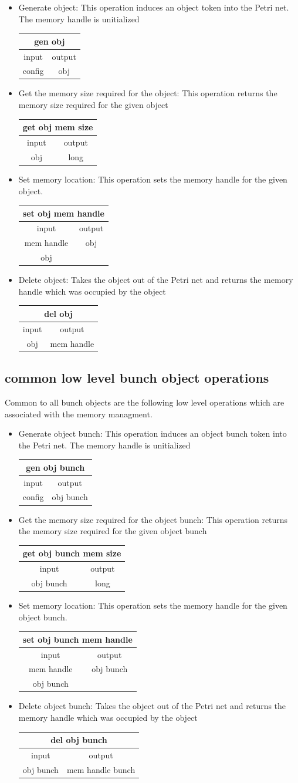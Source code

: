 \documentclass[12pt,a4paper]{article}
\newcommand{\bet}[1]{\begin{center}
		     \begin{tabular}{|c|c|}
		     \hline
		     \multicolumn{2}{|c|}{#1}\\
		     \hline\hline
		     input & output \\
                     \hline}
\newcommand{\eet}{\hline
		  \end{tabular}
		  \end{center}}
\begin{document}
\begin{itemize}
\item Generate object:
\newline
This operation induces an object token into the Petri net. The
memory handle is unitialized
\bet{gen obj}
config & obj \\
\eet
\item Get the memory size required for the object:
\newline
This operation returns the memory size required for the given
object
\bet{get obj mem size}
obj & long \\
\eet
\item Set memory location:
\newline
This operation sets the memory handle for the given object.
\bet{set obj mem handle}
mem handle & obj \\
obj        & \\
\eet
\item Delete object:
\newline
Takes the object out of the Petri net and returns the memory handle 
which was occupied by the object
\newline
\bet{del obj}
obj & mem handle\\
\eet
\end{itemize}

\subsection{common low level bunch object operations}

Common to all bunch objects are the following low level operations
which are associated with the memory managment. 

\begin{itemize}
\item Generate object bunch:
\newline
This operation induces an object bunch token into the Petri net. The
memory handle is unitialized
\bet{gen obj bunch}
config & obj bunch \\
\eet
\item Get the memory size required for the object bunch:
\newline
This operation returns the memory size required for the given
object bunch
\bet{get obj bunch mem size}
obj bunch & long \\
\eet
\item Set memory location:
\newline
This operation sets the memory handle for the given object bunch. 
\bet{set obj bunch mem handle}
mem handle & obj bunch \\
obj bunch       & \\
\eet
\item Delete object bunch:
\newline
Takes the object out of the Petri net and returns the memory handle 
which was occupied by the object
\newline
\bet{del obj bunch}
obj bunch & mem handle bunch\\
\eet
\end{itemize}
\end{document}
